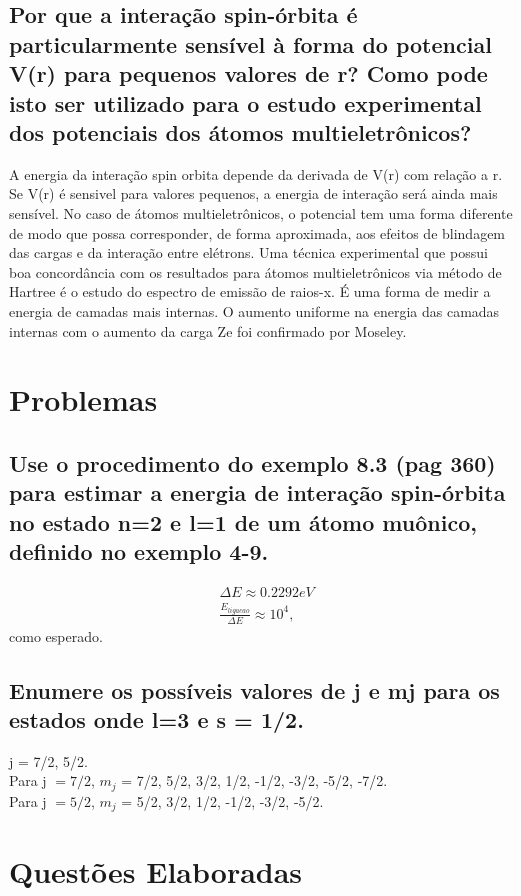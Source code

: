 \documentclass{article}
\begin{document}
\subsection{Por que a interação spin-órbita é particularmente sensível à forma do potencial V(r) para pequenos valores de r? Como pode isto ser utilizado para o estudo experimental dos potenciais dos átomos multieletrônicos?}
A energia da interação spin orbita depende da derivada de V(r) com relação a r. Se V(r) é sensivel para valores pequenos, a energia de interação será ainda mais sensível.
No caso de átomos multieletrônicos, o potencial tem uma forma diferente de modo que possa corresponder, de forma aproximada, aos efeitos de blindagem das cargas e da interação entre elétrons.
Uma técnica experimental que possui boa concordância com os resultados para átomos multieletrônicos via método de Hartree é o estudo do espectro de emissão de raios-x. É uma forma de medir a energia de camadas mais internas. O aumento uniforme na energia das camadas internas com o aumento da carga Ze foi confirmado por Moseley.

\section{Problemas}
\subsection{Use o procedimento do exemplo 8.3 (pag 360) para estimar a energia de interação spin-órbita no estado n=2 e l=1 de um átomo muônico, definido no exemplo 4-9.}

\nonumber \begin{align}
    &\Delta E \approx 0.2292 eV \\
    &\frac{E_{ligacao}}{\Delta E} \approx 10^4, 
\end{align}
como esperado.

\subsection{Enumere os possíveis valores de j e mj para os estados onde l=3 e s = 1/2.}

j = 7/2, 5/2.
\[ \]
Para j $ = 7/2$, $m_j$ = 7/2, 5/2, 3/2, 1/2, -1/2, -3/2, -5/2, -7/2.
\[ \]
Para j $ = 5/2$, $m_j$ = 5/2, 3/2, 1/2, -1/2, -3/2, -5/2.


\section{Questões Elaboradas}
\end{document}
